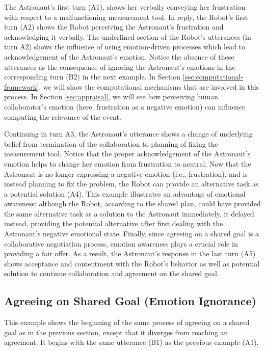The Astronaut's first turn (A1), shows her verbally conveying her frustration
with respect to a malfunctioning measurement tool. In reply, the Robot's first
turn (A2) shows the Robot perceiving the Astronaut's frustration and
acknowledging it verbally. The underlined section of the Robot's utterances (in
turn A2) shows the influence of using emotion-driven processes which lead to
acknowledgement of the Astronaut's emotion. Notice the absence of these
utterances as the consequence of ignoring the Astronaut's emotions in the
corresponding turn (B2) in the next example. In Section
\ref{sec:computational-framework}, we will show the computational mechanisms
that are involved in this process. In Section \ref{sec:appraisal}, we will see
how perceiving human collaborator's emotion (here, frustration as a negative
emotion) can influence computing the relevance of the event.

Continuing in turn A3, the Astronaut's utterance shows a change of underlying
belief from termination of the collaboration to planning of fixing the
measurement tool. Notice that the proper acknowledgement of the Astronaut's
emotion helps to change her emotion from frustration to neutral. Now that the
Astronaut is no longer expressing a negative emotion (i.e., frustration), and is
instead planning to fix the problem, the Robot can provide an alternative task
as a potential solution (A4). This example illustrates an advantage of emotional
awareness: although the Robot, according to the shared plan, could have provided
the same alternative task as a solution to the Astronaut immediately, it delayed
instead, providing the potential alternative after first dealing with the
Astronaut's negative emotional state. Finally, since agreeing on a shared goal
is a collaborative negotiation process, emotion awareness plays a crucial role
in providing a fair offer. As a result, the Astronaut's response in the last
turn (A5) shows acceptance and contentment with the Robot's behavior as well as
potential solution to continue collaboration and agreement on the shared goal.

\subsection{Agreeing on Shared Goal (Emotion Ignorance)}
\label{sec:exp2}

This example shows the beginning of the same process of agreeing on a shared
goal as in the previous section, except that it diverges from reaching an
agreement. It begins with the same utterance (B1) as the previous example (A1).

